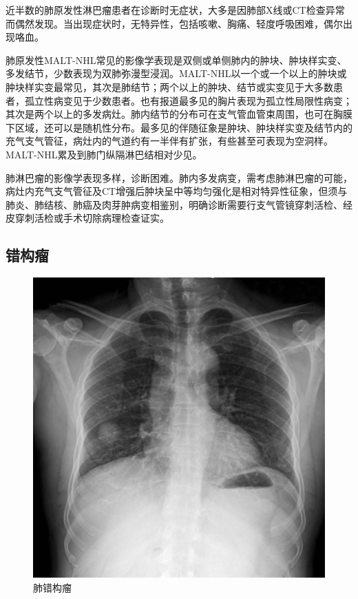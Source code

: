 近半数的肺原发性淋巴瘤患者在诊断时无症状，大多是因肺部X线或CT检查异常而偶然发现。当出现症状时，无特异性，包括咳嗽、胸痛、轻度呼吸困难，偶尔出现咯血。

肺原发性MALT-NHL常见的影像学表现是双侧或单侧肺内的肿块、肿块样实变、多发结节，少数表现为双肺弥漫型浸润。MALT-NHL以一个或一个以上的肿块或肿块样实变最常见，其次是肺结节；两个以上的肿块、结节或实变见于大多数患者，孤立性病变见于少数患者。也有报道最多见的胸片表现为孤立性局限性病变；其次是两个以上的多发病灶。肺内结节的分布可在支气管血管束周围，也可在胸膜下区域，还可以是随机性分布。最多见的伴随征象是肿块、肿块样实变及结节内的充气支气管征，病灶内的气道约有一半伴有扩张，有些甚至可表现为空洞样。MALT-NHL累及到肺门纵隔淋巴结相对少见。

肺淋巴瘤的影像学表现多样，诊断困难。肺内多发病变，需考虑肺淋巴瘤的可能，病灶内充气支气管征及CT增强后肿块呈中等均匀强化是相对特异性征象，但须与肺炎、肺结核、肺癌及肉芽肿病变相鉴别，明确诊断需要行支气管镜穿刺活检、经皮穿刺活检或手术切除病理检查证实。

\subsection{错构瘤}

\begin{figure}[!htbp]
 \centering
 \includegraphics{./images/Image00173.jpg}
 \captionsetup{justification=centering}
 \caption{肺错构瘤}
 \label{fig3-8-11}
  \end{figure} 

